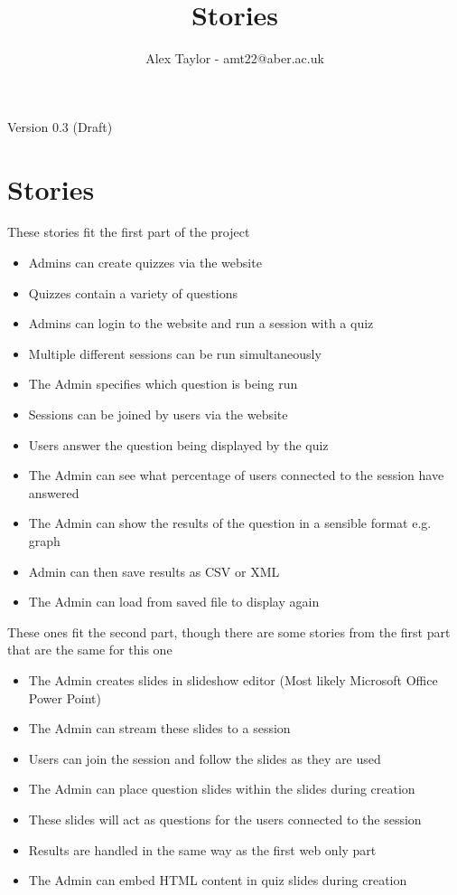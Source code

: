 \documentclass{article}
\title{Stories}
\author{Alex Taylor - amt22@aber.ac.uk}
\begin{document}
\maketitle
\begin{center}
	Version 0.3 (Draft)
\end{center}
\thispagestyle{empty}

\section{Stories}
These stories fit the first part of the project
\begin{itemize}
	\item Admins can create quizzes via the website
	\item Quizzes contain a variety of questions
	\item Admins can login to the website and run a session with a quiz
	\item Multiple different sessions can be run simultaneously
	\item The Admin specifies which question is being run
	\item Sessions can be joined by users via the website
	\item Users answer the question being displayed by the quiz
	\item The Admin can see what percentage of users connected to the session have answered
	\item The Admin can show the results of the question in a sensible format e.g. graph
	\item Admin can then save results as CSV or XML
	\item The Admin can load from saved file to display again
\end{itemize}
These ones fit the second part, though there are some stories from the first part that are the same for this one
\begin{itemize}
	\item The Admin creates slides in slideshow editor (Most likely Microsoft Office Power Point)
	\item The Admin can stream these slides to a session
	\item Users can join the session and follow the slides as they are used	
	\item The Admin can place question slides within the slides during creation
	\item These slides will act as questions for the users connected to the session
	\item Results are handled in the same way as the first web only part
	\item The Admin can embed HTML content in quiz slides during creation
\end{itemize}
\end{document}
